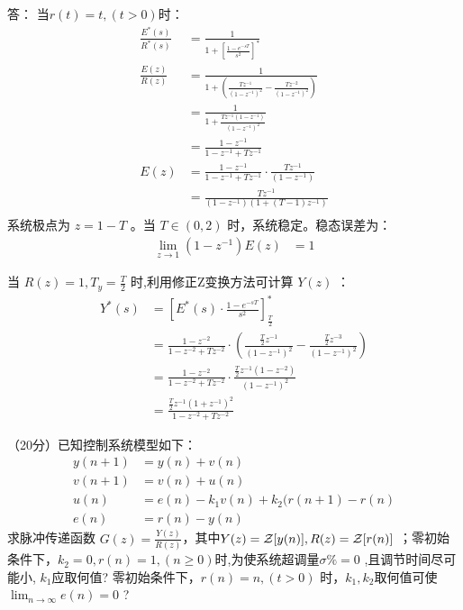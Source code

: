 {	
	
	\onlyanswer
	{
		答： 当$r(t)=t,(t>0)$时：
		\begin{align*}
		\frac{E^*(s)}{R^*(s)} &= \frac{1}{1+\left[\frac{1-e^{-sT}}{s^2}\right]^*} \\
		\frac{E(z)}{R(z)} &= \frac{1}{1+(\frac{Tz^{-1}}{(1-z^{-1})^2}-\frac{Tz^{-2}}{(1-z^{-1})^2})} \\
		&=\frac{1}{1+\frac{Tz^{-1}(1-z^{-1})}{(1-z^{-1})^2}} \\
		&= \frac{1-z^{-1}}{1-z^{-1}+Tz^{-1}} \\
		E(z)&=\frac{1-z^{-1}}{1-z^{-1}+Tz^{-1}} \cdot \frac{Tz^{-1}}{(1-z^{-1})} \\
		&=\frac{Tz^{-1}}{(1-z^{-1})(1+(T-1)z^{-1})} \\
		\end{align*}
		系统极点为 $z=1-T$ 。当 $T\in (0,2)$ 时，系统稳定。稳态误差为：
		\begin{align*}
		\lim_{z\rightarrow 1}(1-z^{-1})E(z) &=1
		\end{align*}
		
		当 $R(z)=1,T_y=\frac{T}{2}$ 时,利用修正Z变换方法可计算 $Y(z)$ ：
		\begin{align*}
		Y^*(s) &= \left[E^*(s)\cdot\frac{1-e^{-sT}}{s^2}\right]^*_{\frac{T}{2}} \\
		&=\frac{1-z^{-2}}{1-z^{-2}+Tz^{-2}}\cdot\left(\frac{\frac{T}{2}z^{-1}}{(1-z^{-1})^2}-\frac{\frac{T}{2}z^{-3}}{(1-z^{-1})^2}\right) \\
		&=\frac{1-z^{-2}}{1-z^{-2}+Tz^{-2}}\cdot\frac{\frac{T}{2}z^{-1}(1-z^{-2})}{(1-z^{-1})^2} \\
		&=\frac{\frac{T}{2}z^{-1}(1+z^{-1})^2}{1-z^{-2}+Tz^{-2}}
		\end{align*}
	}
	
}


\onlytest{\newpage}

\question（20分）已知控制系统模型如下：
\begin{align*}
y(n+1) & =y(n)+v(n) \\
v(n+1) & =v(n)+u(n) \\
u(n) &=e(n)-k_1 v(n)+k_2 (r(n+1)-r(n)\\
e(n) &=r(n)- y(n)
\end{align*}
求脉冲传递函数  $G(z)=\frac{Y(z)}{R(z)}$，其中$Y(z)={\cal Z}[y(n)],R(z)={\cal Z}[r(n)]$ ；零初始条件下，$k_2=0,r(n)=1,(n\geq 0)$时,为使系统超调量$\sigma\%=0$ ,且调节时间尽可能小, $k_1$应取何值? 零初始条件下，$r(n)=n,(t>0)$ 时，$k_1,k_2$取何值可使 $\lim_{n\to\infty}e(n)=0$ ?


